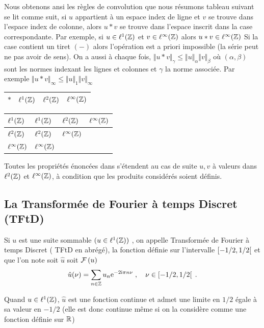 Nous obtenons ansi les r\`{e}gles de convolution que nous r\'esumons tableau suivant se lit comme suit, si $u$ appartient \`{a} un espace index de ligne et $v$ se trouve dans l'espace index de colonne, alors $u*v$ se trouve dans l'espace inscrit dans la case correspondante. Par exemple, si $u\in \ell^1(\mathbb{Z})$ et $v\in \ell^\infty(\mathbb{Z})$ alors $u*v\in \ell^\infty(\mathbb{Z})$ Si la case contient un tiret $(-)$ alors l'op\'{e}ration est a priori impossible (la s\'erie  peut ne pas avoir de sens). On a aussi \`{a} chaque fois, $\Vert u*v\Vert_{\gamma}\leq\Vert u\Vert_{\alpha}\Vert v\Vert_{\beta}$ où $(\alpha, \beta)$ sont les normes indexant les lignes et colonnes et $\gamma$ la norme associée. Par exemple $\Vert u*v\Vert_{\infty}\leq\Vert u\Vert_{1}\Vert v\Vert_{\infty}$
\begin{center}
\begin{tabular}{|l|l|l|l|}
\hline
\multicolumn{1}{|l|}{$*$}&	\multicolumn{1}{|l|}{ $\ell^1(\mathbb{Z})$}&	\multicolumn{1}{|l|}{ $\ell^2(\mathbb{Z})$}&	\multicolumn{1}{|l|}{ $\ell^\infty(\mathbb{Z})$}	\\
\hline
\end{tabular}


\begin{tabular}{|l|l|l|l|}
\hline
\multicolumn{1}{|l|}{$\ell^1(\mathbb{Z})$}&	\multicolumn{1}{|l|}{ $\ell^1(\mathbb{Z})$}&	\multicolumn{1}{|l|}{ $\ell^2(\mathbb{Z})$}&	\multicolumn{1}{|l|}{ $\ell^\infty(\mathbb{Z})$}	\\
\hline
\multicolumn{1}{|l|}{ $\ell^2(\mathbb{Z})$}&	\multicolumn{1}{|l|}{ $\ell^2(\mathbb{Z})$}&	\multicolumn{1}{|l|}{ $\ell^\infty(\mathbb{Z})$}&	\multicolumn{1}{|l|}{}	\\
\hline
\multicolumn{1}{|l|}{ $\ell^\infty(\mathbb{Z})$}&	\multicolumn{1}{|l|}{ $\ell^\infty(\mathbb{Z})$}&	\multicolumn{1}{|l|}{}&	\multicolumn{1}{|l|}{}	\\
\hline
\end{tabular}
\end{center}
Toutes les propriétés énoncées dans  s'étendent au cas de suite $u, v$ à valeurs dans $\ell^2(\mathbb{Z})$ et $\ell^\infty(\mathbb{Z})$, à condition que les produits considérés soient définis.

\subsection{La Transform\'{e}e de Fourier \`{a} temps Discret (TFtD)}
\begin{definition}
Si $u$ est une suite sommable $(u\in \ell^1(\mathbb{Z}))$ , on appelle Transform\'{e}e de Fourier \`{a} temps Discret ( TFtD en abr\'{e}g\'{e}), la fonction d\'{e}finie sur l'intervalle $\left[-1/2,1/2\right[$
et que l'on note soit $\hat{u}$ soit $\mathcal{F}\left( u \right)$
$$
\hat{u}(\nu)=\sum_{n\in \mathbb{Z}}u_{n}\mathrm{e}^{-2\mathrm{i}\pi n \nu } \;, \quad \nu \in \left[-1/2,1/2\right[ \;.
$$
\end{definition}
Quand $u\in \ell^1(\mathbb{Z})$, $\hat{u}$ est une fonction continue et admet une limite en $1/2$ \'{e}gale \`{a} sa valeur en $-1/2$
(elle est donc continue m\^{e}me si on la consid\`ere comme une fonction d\'{e}finie sur $\mathbb{R}$)

